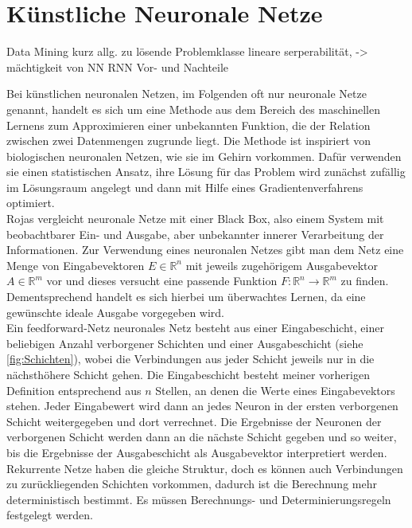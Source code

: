 \documentclass[
	12pt,
	a4paper,
	BCOR10mm,
	DIV14,
	listof=totoc,
	bibliography=totoc,
	headsepline
]{scrreprt}
\begin{document}
\section{Künstliche Neuronale Netze}
Data Mining kurz allg.
zu lösende Problemklasse 
lineare serperabilität, -> mächtigkeit von NN
RNN
Vor- und Nachteile

Bei künstlichen neuronalen Netzen, im Folgenden oft nur neuronale Netze genannt, handelt es sich um eine Methode aus dem Bereich des maschinellen Lernens zum Approximieren einer unbekannten Funktion, die der Relation zwischen zwei Datenmengen zugrunde liegt. Die Methode ist inspiriert von biologischen neuronalen Netzen, wie sie im Gehirn vorkommen. 
Dafür verwenden sie einen statistischen Ansatz, ihre Lösung für das Problem wird zunächst zufällig im Lösungsraum angelegt und dann mit Hilfe eines Gradientenverfahrens optimiert.\\
Rojas \cite{Rojas:1996:NNS:235222} vergleicht neuronale Netze mit einer Black Box, also einem System mit beobachtbarer Ein- und Ausgabe, aber unbekannter innerer Verarbeitung der Informationen. 
Zur Verwendung eines neuronalen Netzes gibt man dem Netz eine Menge von Eingabevektoren $E \in \mathbb{R}^n$ mit jeweils zugehörigem Ausgabevektor $A \in \mathbb{R}^m$ vor und dieses versucht eine passende Funktion $F: \mathbb{R}^n \rightarrow \mathbb{R}^m$ zu finden. Dementsprechend handelt es sich hierbei um überwachtes Lernen, da eine gewünschte ideale Ausgabe vorgegeben wird.\\
Ein feedforward-Netz neuronales Netz besteht aus einer Eingabeschicht, einer beliebigen Anzahl verborgener Schichten und einer Ausgabeschicht (siehe \ref{fig:Schichten}), wobei die Verbindungen aus jeder Schicht jeweils nur in die nächsthöhere Schicht gehen. 
Die Eingabeschicht besteht meiner vorherigen Definition entsprechend aus $n$ Stellen, an denen die Werte eines Eingabevektors stehen. Jeder Eingabewert wird dann an jedes Neuron in der ersten verborgenen Schicht weitergegeben und dort verrechnet. Die Ergebnisse der Neuronen der verborgenen Schicht werden dann an die nächste Schicht gegeben und so weiter, bis die Ergebnisse der Ausgabeschicht als Ausgabevektor interpretiert werden.\\
Rekurrente Netze haben die gleiche Struktur, doch es können auch Verbindungen zu zurückliegenden Schichten vorkommen, dadurch ist die Berechnung mehr deterministisch bestimmt. Es müssen Berechnungs- und Determinierungsregeln festgelegt werden. 
\end{document}
